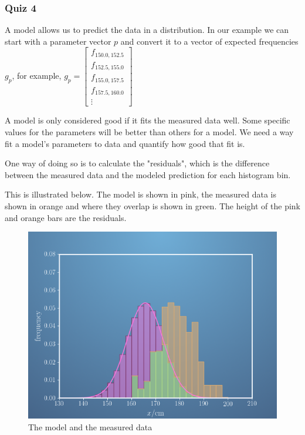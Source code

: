\documentclass[]{article}
\begin{document}
\subsubsection{Quiz 4} 

A model allows us to predict the data in a distribution. In our example we can start with a parameter vector $ p $ and convert it to a vector of expected frequencies $ g_p $, for example, $ g_p =
\begin{bmatrix}
	f_{150.0, 152.5} \\
	f_{152.5, 155.0} \\
	f_{155.0, 157.5} \\
	f_{157.5, 160.0} \\
	\vdots
\end{bmatrix} $

A model is only considered good if it fits the measured data well. Some specific values for the parameters will be better than others for a model. We need a way fit a model's parameters to data and quantify how good that fit is.

One way of doing so is to calculate the "residuals", which is the difference between the measured data and the modeled prediction for each histogram bin.

This is illustrated below. The model is shown in pink, the measured data is shown in orange and where they overlap is shown in green. The height of the pink and orange bars are the residuals.

\begin{figure}[h]
	\centering
	\includegraphics[width=\textwidth]{residuals}
	\caption{The model and the measured data}
	\label{fig:residuals}
\end{figure}
\end{document}
